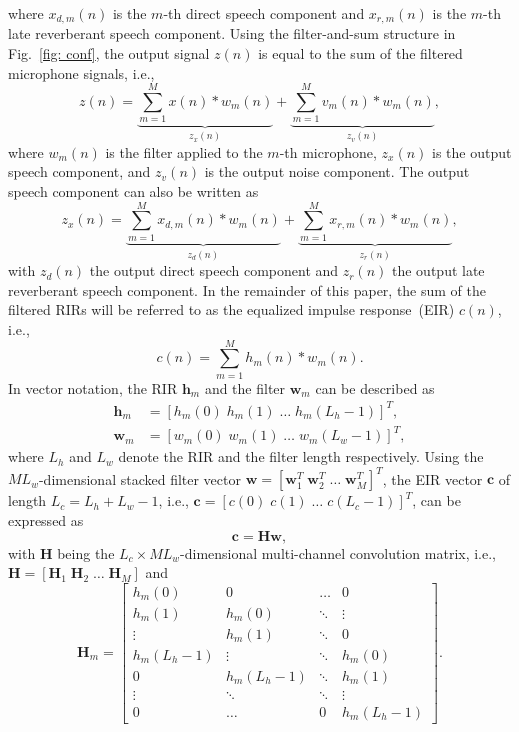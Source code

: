 \documentclass[draftcls,onecolumn,11pt]{IEEEtran}
\begin{document}
where $x_{d,m}(n)$ is the $m$-th direct speech component and $x_{r,m}(n)$ is the $m$-th late reverberant speech component.
Using the filter-and-sum structure in Fig.~\ref{fig: conf}, the output signal $z(n)$ is equal to the sum of the filtered microphone signals, i.e.,
\begin{equation}
  \label{eq: outcomp}
  z(n) = \underbrace{\sum_{m=1}^{M} x(n) \ast  w_m(n)}_{z_x(n)} + \underbrace{\sum_{m=1}^{M} v_m(n) \ast w_m(n)}_{z_v(n)},
\end{equation}
where $w_m(n)$ is the filter applied to the $m$-th microphone, $z_x(n)$ is the output speech component, and $z_v(n)$ is the output noise component.
The output speech component can also be written as
\begin{equation}
\label{eq: zxdzxr}
z_x(n) = \underbrace{\sum_{m=1}^{M} x_{d,m}(n) \ast  w_m(n)}_{z_d(n)} + \underbrace{\sum_{m=1}^{M} x_{r,m}(n) \ast  w_m(n)}_{z_r(n)}, \!\!
\end{equation}
with $z_d(n)$ the output direct speech component and $z_r(n)$ the output late reverberant speech component.
In the remainder of this paper, the sum of the filtered RIRs will be referred to as the equalized impulse response~(EIR) $c(n)$, i.e.,
\begin{equation}
\label{eq: eir}
c(n) = \sum_{m=1}^M h_m(n) \ast w_m(n).
\end{equation}
In vector notation, the RIR $\mathbf{h}_m$ and the filter $\mathbf{w}_m$ can be described as 
\begin{align}
\mathbf{h}_m  & = [h_m(0) \; h_m(1) \; \ldots \; h_m(L_h-1)]^T, \\
\mathbf{w}_m  & = [w_m(0) \; w_m(1) \; \ldots \; w_m(L_w-1)]^T,
\end{align}
where $L_h$ and $L_w$ denote the RIR and the filter length respectively.
Using the $M L_w$-dimensional stacked filter vector $\mathbf{w} = [\mathbf{w}^T_1 \; \mathbf{w}^T_2 \; \ldots \; \mathbf{w}^T_M]^T$, the EIR vector $\mathbf{c}$ of length $L_c = L_h + L_w - 1$, i.e., $\mathbf{c} = [c(0) \; c(1) \; \ldots \; c(L_c-1)]^T$, can be expressed as
\begin{equation}
\label{eq: eir}
\mathbf{c} = \mathbf{H}\mathbf{w},
\end{equation}
with $\mathbf{H}$ being the $L_c \times ML_w$-dimensional multi-channel convolution matrix, i.e., $\mathbf{H}  = [\mathbf{H}_1 \; \mathbf{H}_2 \; \ldots \; \mathbf{H}_M]$ and
\begin{equation}
\mathbf{H}_m \! = \! \begin{bmatrix}
    h_m(0) & 0 &  \ldots & 0 \\
    h_m(1) & h_m(0) & \ddots & \vdots \\
    \vdots & h_m(1) & \ddots & 0 \\
    h_m(L_h\!-\!1) & \vdots & \ddots & h_m(0) \\
    0 & h_m(L_h\!-\!1) & \ddots & h_m(1) \\
    \vdots & \ddots & \ddots & \vdots \\
    0 & \ldots & 0 & h_m(L_h\!-\!1)
   \end{bmatrix}.
 \end{equation}
\end{document}
